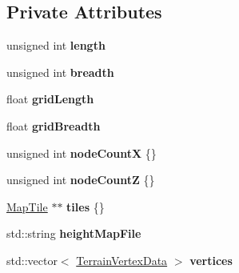 \subsection*{Private Attributes}
\begin{DoxyCompactItemize}
\item 
\mbox{\label{classpiolot_1_1_terrain_adfe24e50e102f6c0dd424e2e7f376f15}} 
unsigned int {\bfseries length}
\item 
\mbox{\label{classpiolot_1_1_terrain_a05c6d7e235fafccc8aaa300fb63dfc27}} 
unsigned int {\bfseries breadth}
\item 
\mbox{\label{classpiolot_1_1_terrain_ac1378a19d70d35bcafa1ac2c9e443d98}} 
float {\bfseries grid\+Length}
\item 
\mbox{\label{classpiolot_1_1_terrain_ac825eeb29fe45a95909488a560ac8331}} 
float {\bfseries grid\+Breadth}
\item 
\mbox{\label{classpiolot_1_1_terrain_af2671f954c4fa1be2228ccf4cb631abf}} 
unsigned int {\bfseries node\+CountX} \{\}
\item 
\mbox{\label{classpiolot_1_1_terrain_a584b5d99c115bcfae303b3feea50c3a5}} 
unsigned int {\bfseries node\+CountZ} \{\}
\item 
\mbox{\label{classpiolot_1_1_terrain_a092c31b5d881c4f89dac30cd887d1664}} 
\mbox{\hyperlink{classpiolot_1_1_map_tile}{Map\+Tile}} $\ast$$\ast$ {\bfseries tiles} \{\}
\item 
\mbox{\label{classpiolot_1_1_terrain_a75cfcac6fb95fb3c63def8362ce393d0}} 
std\+::string {\bfseries height\+Map\+File}
\item 
\mbox{\label{classpiolot_1_1_terrain_a57bd2f1b451a1d670bc5f42134ecf2c0}} 
std\+::vector$<$ \mbox{\hyperlink{structpiolot_1_1_terrain_vertex_data}{Terrain\+Vertex\+Data}} $>$ {\bfseries vertices}
\item 
\mbox{\label{classpiolot_1_1_terrain_a0d8413db780f4ef041fd1794631ef122}} 
$$
\end{DoxyCompactItemize}
